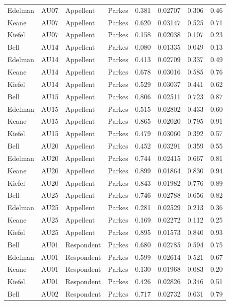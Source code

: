 \documentclass{monashthesis}
\begin{document}
\begin{center}
\begin{longtable}{llllllll}
Edelman & AU07 & Appellent & Parkes & 0.381 & 0.02707 & 0.306 & 0.46 \\
Keane & AU07 & Appellent & Parkes & 0.620 & 0.03147 & 0.525 & 0.71 \\
Kiefel & AU07 & Appellent & Parkes & 0.158 & 0.02038 & 0.107 & 0.23 \\
Bell & AU14 & Appellent & Parkes & 0.080 & 0.01335 & 0.049 & 0.13 \\
Edelman & AU14 & Appellent & Parkes & 0.413 & 0.02709 & 0.337 & 0.49 \\
Keane & AU14 & Appellent & Parkes & 0.678 & 0.03016 & 0.585 & 0.76 \\
Kiefel & AU14 & Appellent & Parkes & 0.529 & 0.03037 & 0.441 & 0.62 \\
Bell & AU15 & Appellent & Parkes & 0.806 & 0.02511 & 0.723 & 0.87 \\
Edelman & AU15 & Appellent & Parkes & 0.515 & 0.02802 & 0.433 & 0.60 \\
Keane & AU15 & Appellent & Parkes & 0.865 & 0.02020 & 0.795 & 0.91 \\
Kiefel & AU15 & Appellent & Parkes & 0.479 & 0.03060 & 0.392 & 0.57 \\
Bell & AU20 & Appellent & Parkes & 0.452 & 0.03291 & 0.359 & 0.55 \\
Edelman & AU20 & Appellent & Parkes & 0.744 & 0.02415 & 0.667 & 0.81 \\
Keane & AU20 & Appellent & Parkes & 0.899 & 0.01864 & 0.830 & 0.94 \\
Kiefel & AU20 & Appellent & Parkes & 0.843 & 0.01982 & 0.776 & 0.89 \\
Bell & AU25 & Appellent & Parkes & 0.746 & 0.02788 & 0.656 & 0.82 \\
Edelman & AU25 & Appellent & Parkes & 0.281 & 0.02529 & 0.213 & 0.36 \\
Keane & AU25 & Appellent & Parkes & 0.169 & 0.02272 & 0.112 & 0.25 \\
Kiefel & AU25 & Appellent & Parkes & 0.895 & 0.01573 & 0.840 & 0.93 \\
Bell & AU01 & Respondent & Parkes & 0.680 & 0.02785 & 0.594 & 0.75 \\
Edelman & AU01 & Respondent & Parkes & 0.599 & 0.02614 & 0.521 & 0.67 \\
Keane & AU01 & Respondent & Parkes & 0.130 & 0.01968 & 0.083 & 0.20 \\
Kiefel & AU01 & Respondent & Parkes & 0.426 & 0.02826 & 0.346 & 0.51 \\
Bell & AU02 & Respondent & Parkes & 0.717 & 0.02732 & 0.631 & 0.79 \\

\end{longtable}
\end{center}
\end{document}
